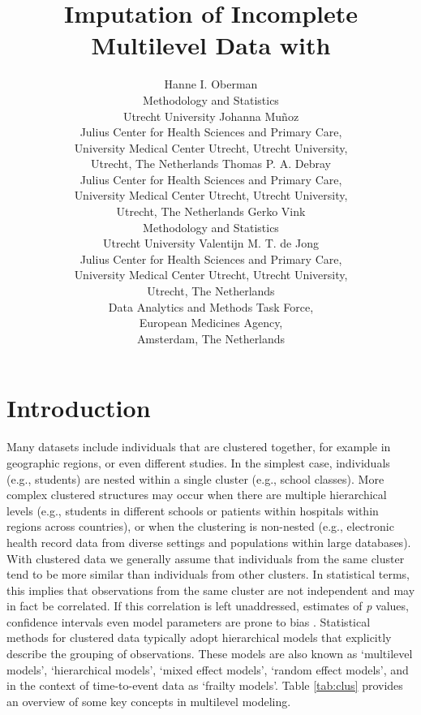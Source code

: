 \documentclass[
]{jss}
\author{
Hanne I. Oberman\\Methodology and Statistics\\
Utrecht University \And Johanna Muñoz\\Julius Center for Health Sciences
and Primary Care,\\
University Medical Center Utrecht, Utrecht University,\\
Utrecht, The Netherlands \AND Thomas P. A. Debray\\Julius Center
for Health Sciences and Primary Care,\\
University Medical Center Utrecht, Utrecht University,\\
Utrecht, The Netherlands \And Gerko Vink\\Methodology and Statistics\\
Utrecht University \AND Valentijn M. T. de Jong\\Julius Center for
Health Sciences and Primary Care,\\
University Medical Center Utrecht, Utrecht University,\\
Utrecht, The Netherlands\\
Data Analytics and Methods Task Force,\\
European Medicines Agency,\\
Amsterdam, The Netherlands
}
\title{Imputation of Incomplete Multilevel Data with \pkg{mice}}
\begin{document}
\hypertarget{introduction}{%
\section{Introduction}\label{introduction}}

Many datasets include individuals that are clustered together, for
example in geographic regions, or even different studies. In the
simplest case, individuals (e.g., students) are nested within a single
cluster (e.g., school classes). More complex clustered structures may
occur when there are multiple hierarchical levels (e.g., students in
different schools or patients within hospitals within regions across
countries), or when the clustering is non-nested (e.g., electronic
health record data from diverse settings and populations within large
databases). With clustered data we generally assume that individuals
from the same cluster tend to be more similar than individuals from
other clusters. In statistical terms, this implies that observations
from the same cluster are not independent and may in fact be correlated.
If this correlation is left unaddressed, estimates of \emph{p} values,
confidence intervals even model parameters are prone to bias
\citep{loca01}. Statistical methods for clustered data typically adopt
hierarchical models that explicitly describe the grouping of
observations. These models are also known as `multilevel models',
`hierarchical models', `mixed effect models', `random effect models',
and in the context of time-to-event data as `frailty models'. Table
\ref{tab:clus} provides an overview of some key concepts in multilevel
modeling.
\end{document}
